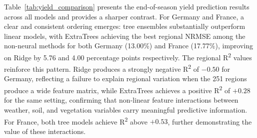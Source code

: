 \documentclass[pdflatex,sn-mathphys-num, oneside, 11pt]{sn-jnl}%
\theoremstyle{thmstyleone}%
\theoremstyle{thmstyletwo}%
\theoremstyle{thmstylethree}%
\begin{document}
Table~\ref{tab:yield_comparison} presents the end-of-season yield prediction results across all models and provides a sharper contrast. For Germany and France, a clear and consistent ordering emerges: tree ensembles substantially outperform linear models, with ExtraTrees achieving the best regional NRMSE among the non-neural methods for both Germany (13.00\%) and France (17.77\%), improving on Ridge by 5.76 and 4.00 percentage points respectively. The regional R\textsuperscript{2} values reinforce this pattern. Ridge produces a strongly negative R\textsuperscript{2} of $-0.50$ for Germany, reflecting a failure to explain regional variation when the 251 regions produce a wide feature matrix, while ExtraTrees achieves a positive R\textsuperscript{2} of $+0.28$ for the same setting, confirming that non-linear feature interactions between weather, soil, and vegetation variables carry meaningful predictive information. For France, both tree models achieve R\textsuperscript{2} above $+0.53$, further demonstrating the value of these interactions.
\end{document}
